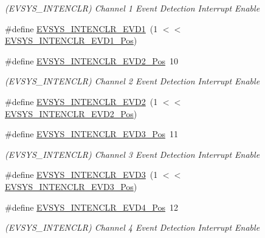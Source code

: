 \begin{DoxyCompactItemize}
\begin{DoxyCompactList}\small\item\em (E\+V\+S\+Y\+S\+\_\+\+I\+N\+T\+E\+N\+C\+LR) Channel 1 Event Detection Interrupt Enable \end{DoxyCompactList}\item 
\#define \mbox{\hyperlink{group___s_a_m_d21___e_v_s_y_s_ga459758c1f1e6bd8a40bab3d9caa23ec8}{E\+V\+S\+Y\+S\+\_\+\+I\+N\+T\+E\+N\+C\+L\+R\+\_\+\+E\+V\+D1}}~(1 $<$$<$ \mbox{\hyperlink{group___s_a_m_d21___e_v_s_y_s_gabd12d170f66f38972e54314834495117}{E\+V\+S\+Y\+S\+\_\+\+I\+N\+T\+E\+N\+C\+L\+R\+\_\+\+E\+V\+D1\+\_\+\+Pos}})
\item 
\#define \mbox{\hyperlink{group___s_a_m_d21___e_v_s_y_s_ga532eeca3a85b502003b28b968ac30625}{E\+V\+S\+Y\+S\+\_\+\+I\+N\+T\+E\+N\+C\+L\+R\+\_\+\+E\+V\+D2\+\_\+\+Pos}}~10
\begin{DoxyCompactList}\small\item\em (E\+V\+S\+Y\+S\+\_\+\+I\+N\+T\+E\+N\+C\+LR) Channel 2 Event Detection Interrupt Enable \end{DoxyCompactList}\item 
\#define \mbox{\hyperlink{group___s_a_m_d21___e_v_s_y_s_gaca8fe60ce667ef8c386033913db0cdb6}{E\+V\+S\+Y\+S\+\_\+\+I\+N\+T\+E\+N\+C\+L\+R\+\_\+\+E\+V\+D2}}~(1 $<$$<$ \mbox{\hyperlink{group___s_a_m_d21___e_v_s_y_s_ga532eeca3a85b502003b28b968ac30625}{E\+V\+S\+Y\+S\+\_\+\+I\+N\+T\+E\+N\+C\+L\+R\+\_\+\+E\+V\+D2\+\_\+\+Pos}})
\item 
\#define \mbox{\hyperlink{group___s_a_m_d21___e_v_s_y_s_ga9b3a9f98637dea0c9a77145a85c39149}{E\+V\+S\+Y\+S\+\_\+\+I\+N\+T\+E\+N\+C\+L\+R\+\_\+\+E\+V\+D3\+\_\+\+Pos}}~11
\begin{DoxyCompactList}\small\item\em (E\+V\+S\+Y\+S\+\_\+\+I\+N\+T\+E\+N\+C\+LR) Channel 3 Event Detection Interrupt Enable \end{DoxyCompactList}\item 
\#define \mbox{\hyperlink{group___s_a_m_d21___e_v_s_y_s_ga39b454990e99af899238a7d8c5ecf0dc}{E\+V\+S\+Y\+S\+\_\+\+I\+N\+T\+E\+N\+C\+L\+R\+\_\+\+E\+V\+D3}}~(1 $<$$<$ \mbox{\hyperlink{group___s_a_m_d21___e_v_s_y_s_ga9b3a9f98637dea0c9a77145a85c39149}{E\+V\+S\+Y\+S\+\_\+\+I\+N\+T\+E\+N\+C\+L\+R\+\_\+\+E\+V\+D3\+\_\+\+Pos}})
\item 
\#define \mbox{\hyperlink{group___s_a_m_d21___e_v_s_y_s_gaa9392806c2095c093fdbbb794f7323fb}{E\+V\+S\+Y\+S\+\_\+\+I\+N\+T\+E\+N\+C\+L\+R\+\_\+\+E\+V\+D4\+\_\+\+Pos}}~12
\begin{DoxyCompactList}\small\item\em (E\+V\+S\+Y\+S\+\_\+\+I\+N\+T\+E\+N\+C\+LR) Channel 4 Event Detection Interrupt Enable \end{DoxyCompactList}\item 
$$
\end{DoxyCompactItemize}
